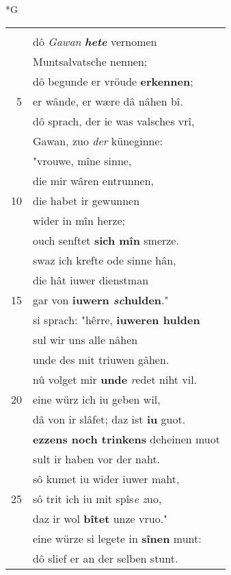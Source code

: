 \documentclass[8pt,a4paper,notitlepage]{article}
\begin{document}
\begin{table}[ht]
\begin{minipage}[t]{0.5\linewidth}
\small
\begin{center}*G
\end{center}
\begin{tabular}{rl}
 & \textit{\begin{large}S\end{large}}i ist von Muntsalvatsche komen."\\ 
 & dô \textit{Gawan} \textit{\textbf{hete}} vernomen\\ 
 & Muntsalvatsche nennen;\\ 
 & dô begunde er vröude \textbf{erkennen};\\ 
5 & er wânde, er wære dâ nâhen bî.\\ 
 & dô sprach, der ie was valsches vrî,\\ 
 & Gawan, zuo \textit{der} küneginne:\\ 
 & "vrouwe, mîne sinne,\\ 
 & die mir wâren entrunnen,\\ 
10 & die habet ir gewunnen\\ 
 & wider in mîn herze;\\ 
 & ouch senftet \textbf{sich mîn} smerze.\\ 
 & swaz ich krefte ode sinne hân,\\ 
 & die hât iuwer dienstman\\ 
15 & gar von \textbf{iuwern \textit{sc}hulden}."\\ 
 & si sprach: "hêrre, \textbf{iuweren hulden}\\ 
 & sul wir uns alle nâhen\\ 
 & unde des mit triuwen gâhen.\\ 
 & nû volget mir \textbf{unde} \textit{r}edet niht vil.\\ 
20 & eine würz ich iu geben wil,\\ 
 & dâ von ir slâfet; daz ist \textbf{iu} guot.\\ 
 & \textbf{ezzens noch trinkens} deheinen muot\\ 
 & sult ir haben vor der naht.\\ 
 & sô kumet iu wider iuwer maht,\\ 
25 & sô trit ich iu mit spîs\textit{e z}uo,\\ 
 & daz ir wol \textbf{bîtet} unze vruo."\\ 
 & eine würze si legete in \textbf{sînen} munt:\\ 
 & dô slief er an der selben stunt.\\ 

\end{tabular}
\end{minipage}
\end{table}
\end{document}
